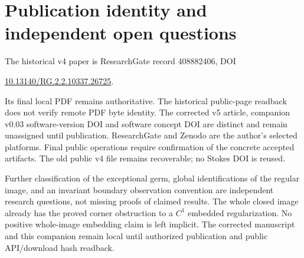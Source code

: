 \documentclass[11pt,a4paper]{article}
\begin{document}
\section{Publication identity and independent open questions}
The historical v4 paper is ResearchGate record 408882406, DOI
\begin{center}\small
\href{https://doi.org/10.13140/RG.2.2.10337.26725}{10.13140/RG.2.2.10337.26725}.
\end{center}
Its final local PDF remains authoritative. The historical public-page
readback does not verify remote PDF byte identity.
The corrected v5 article, companion v0.03 software-version DOI and software
concept DOI are distinct and remain unassigned until publication.
ResearchGate and Zenodo are the author's selected platforms. Final public
operations require confirmation of the concrete accepted artifacts. The
old public v4 file remains recoverable; no Stokes DOI is reused.

Further classification of the exceptional germ, global identifications of
the regular image, and an invariant boundary observation convention are
independent research questions, not missing proofs of claimed results.
The whole closed image already has the proved corner obstruction to a
$C^1$ embedded regularization. No positive whole-image embedding claim is
left implicit. The corrected manuscript and this companion remain local
until authorized publication and public API/download hash readback.
\end{document}
